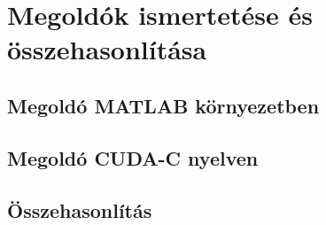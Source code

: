 \chapter{Megoldók ismertetése és összehasonlítása}

\section{Megoldó MATLAB környezetben}


\section{Megoldó CUDA-C nyelven}

\section{Összehasonlítás}
